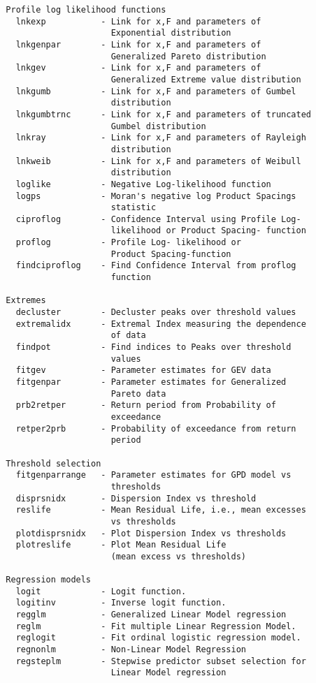 {\begin{verbatim}
  Profile log likelihood functions
    lnkexp           - Link for x,F and parameters of
                       Exponential distribution
    lnkgenpar        - Link for x,F and parameters of
                       Generalized Pareto distribution
    lnkgev           - Link for x,F and parameters of
                       Generalized Extreme value distribution
    lnkgumb          - Link for x,F and parameters of Gumbel
                       distribution
    lnkgumbtrnc      - Link for x,F and parameters of truncated
                       Gumbel distribution
    lnkray           - Link for x,F and parameters of Rayleigh
                       distribution
    lnkweib          - Link for x,F and parameters of Weibull
                       distribution
    loglike          - Negative Log-likelihood function
    logps            - Moran's negative log Product Spacings
                       statistic
    ciproflog        - Confidence Interval using Profile Log-
                       likelihood or Product Spacing- function
    proflog          - Profile Log- likelihood or
                       Product Spacing-function
    findciproflog    - Find Confidence Interval from proflog
                       function

  Extremes
    decluster        - Decluster peaks over threshold values
    extremalidx      - Extremal Index measuring the dependence
                       of data
    findpot          - Find indices to Peaks over threshold
                       values
    fitgev           - Parameter estimates for GEV data
    fitgenpar        - Parameter estimates for Generalized
                       Pareto data
    prb2retper       - Return period from Probability of
                       exceedance
    retper2prb       - Probability of exceedance from return
                       period

  Threshold selection
    fitgenparrange   - Parameter estimates for GPD model vs
                       thresholds
    disprsnidx       - Dispersion Index vs threshold
    reslife          - Mean Residual Life, i.e., mean excesses
                       vs thresholds
    plotdisprsnidx   - Plot Dispersion Index vs thresholds
    plotreslife      - Plot Mean Residual Life
                       (mean excess vs thresholds)

  Regression models
    logit            - Logit function.
    logitinv         - Inverse logit function.
    regglm           - Generalized Linear Model regression
    reglm            - Fit multiple Linear Regression Model.
    reglogit         - Fit ordinal logistic regression model.
    regnonlm         - Non-Linear Model Regression
    regsteplm        - Stepwise predictor subset selection for
                       Linear Model regression


\end{verbatim}}
